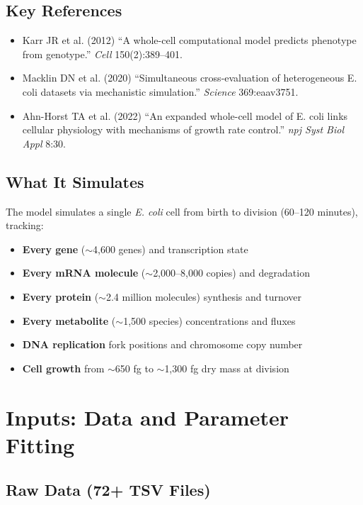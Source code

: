 \documentclass[11pt,a4paper]{report}
\begin{document}
\subsection{Key References}

\begin{itemize}
    \item Karr JR et al. (2012) ``A whole-cell computational model predicts phenotype from genotype.'' \emph{Cell} 150(2):389--401.
    \item Macklin DN et al. (2020) ``Simultaneous cross-evaluation of heterogeneous E. coli datasets via mechanistic simulation.'' \emph{Science} 369:eaav3751.
    \item Ahn-Horst TA et al. (2022) ``An expanded whole-cell model of E. coli links cellular physiology with mechanisms of growth rate control.'' \emph{npj Syst Biol Appl} 8:30.
\end{itemize}

\subsection{What It Simulates}

The model simulates a single \emph{E. coli} cell from birth to division (60--120 minutes), tracking:

\begin{itemize}
    \item \textbf{Every gene} ($\sim$4,600 genes) and transcription state
    \item \textbf{Every mRNA molecule} ($\sim$2,000--8,000 copies) and degradation
    \item \textbf{Every protein} ($\sim$2.4 million molecules) synthesis and turnover
    \item \textbf{Every metabolite} ($\sim$1,500 species) concentrations and fluxes
    \item \textbf{DNA replication} fork positions and chromosome copy number
    \item \textbf{Cell growth} from $\sim$650 fg to $\sim$1,300 fg dry mass at division
\end{itemize}

\section{Inputs: Data and Parameter Fitting}

\subsection{Raw Data (72+ TSV Files)}
\end{document}
